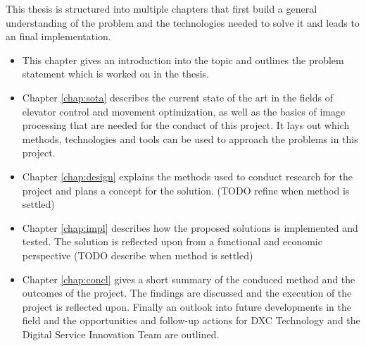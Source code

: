 This thesis is structured into multiple chapters that first build a general understanding of the problem and the technologies needed to solve it and leads to an final implementation.

\begin{itemize}
    \item This chapter gives an introduction into the topic and outlines the problem statement which is worked on in the thesis.
    \item Chapter \ref{chap:sota} describes the current state of the art in the fields of elevator control and movement optimization, as well as the basics of image processing that are needed for the conduct of this project. It lays out which methods, technologies and tools can be used to approach the problems in this project.
    \item Chapter \ref{chap:design} explains the methods used to conduct research for the project and plans a concept for the solution. (TODO refine when method is settled)
    \item Chapter \ref{chap:impl} describes how the proposed solutions is implemented and tested. The solution is reflected upon from a functional and economic perspective  (TODO describe when method is settled)
    \item Chapter \ref{chap:concl} gives a short summary of the conduced method and the outcomes of the project. The findings are discussed and the execution of the project is reflected upon. Finally an outlook into future developments in the field and the opportunities and follow-up actions for DXC Technology and the Digital Service Innovation Team are outlined.
\end{itemize}